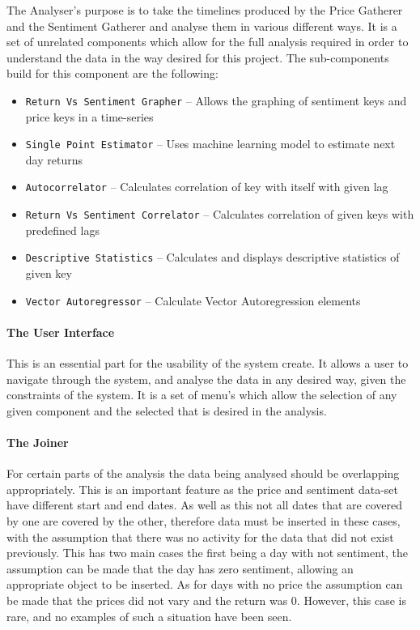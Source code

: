 The Analyser's purpose is to take the timelines produced by the Price Gatherer and the Sentiment Gatherer and analyse them in various different ways. It is a set of unrelated components which allow for the full analysis required in order to understand the data in the way desired for this project. The sub-components build for this component are the following:
\begin{itemize}
    \item \texttt{Return Vs Sentiment Grapher} -- Allows the graphing of sentiment keys and price keys in a time-series
    \item \texttt{Single Point Estimator} -- Uses machine learning model to estimate next day returns
    \item \texttt{Autocorrelator} -- Calculates correlation of key with itself with given lag
    \item \texttt{Return Vs Sentiment Correlator} -- Calculates correlation of given keys with predefined lags
    \item \texttt{Descriptive Statistics} -- Calculates and displays descriptive statistics of given key
    \item \texttt{Vector Autoregressor} -- Calculate Vector Autoregression elements
\end{itemize}

\paragraph{The User Interface}

This is an essential part for the usability of the system create. It allows a user to navigate through the system, and analyse the data in any desired way, given the constraints of the system. It is a set of menu's which allow the selection of any given component and the selected that is desired in the analysis.

\paragraph{The Joiner}

For certain parts of the analysis the data being analysed should be overlapping appropriately. This is an important feature as the price and sentiment data-set have different start and end dates. As well as this not all dates that are covered by one are covered by the other, therefore data must be inserted in these cases, with the assumption that there was no activity for the data that did not exist previously. This has two main cases the first being a day with not sentiment, the assumption can be made that the day has zero sentiment, allowing an appropriate object to be inserted. As for days with no price the assumption can be made that the prices did not vary and the return was 0. However, this case is rare, and no examples of such a situation have been seen.

